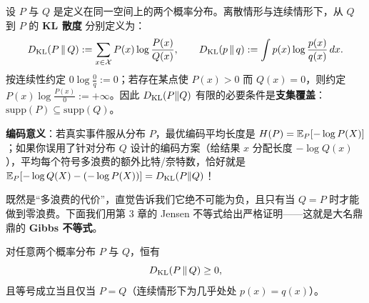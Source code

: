 \begin{defBox}
\begin{definition}
\label{def:ch4-kl}
设 $P$ 与 $Q$ 是定义在同一空间上的两个概率分布。离散情形与连续情形下，从 $Q$ 到 $P$ 的 \textbf{KL 散度} 分别定义为：
\begin{equation}
  D_{\mathrm{KL}}(P \,\|\, Q) := \sum_{x \in \mathcal{X}} P(x)\log\frac{P(x)}{Q(x)},
  \qquad
  D_{\mathrm{KL}}(p \,\|\, q) := \int p(x)\log\frac{p(x)}{q(x)}\,dx. \label{eq:ch4-kl}
\end{equation}
按连续性约定 $0\log\frac{0}{q} := 0$；若存在某点使 $P(x) > 0$ 而 $Q(x) = 0$，则约定 $P(x)\log\frac{P(x)}{0} := +\infty$。因此 $D_{\mathrm{KL}}(P\|Q)$ 有限的必要条件是\textbf{支集覆盖}：$\mathrm{supp}(P) \subseteq \mathrm{supp}(Q)$。
\end{definition}
\end{defBox}

\textbf{编码意义}：若真实事件服从分布 $P$，最优编码平均长度是 $H(P) = \mathbb{E}_P[-\log P(X)]$；如果你误用了针对分布 $Q$ 设计的编码方案（给结果 $x$ 分配长度 $-\log Q(x)$），平均每个符号多浪费的额外比特/奈特数，恰好就是 $\mathbb{E}_P[-\log Q(X) - (-\log P(X))] = D_{\mathrm{KL}}(P \| Q)$！

既然是“多浪费的代价”，直觉告诉我们它绝不可能为负，且只有当 $Q = P$ 时才能做到零浪费。下面我们用第 3 章的 Jensen 不等式给出严格证明——这就是大名鼎鼎的 \textbf{Gibbs 不等式}。

\begin{thmBox}
\begin{theorem}
\label{thm:ch4-gibbs}
对任意两个概率分布 $P$ 与 $Q$，恒有
\begin{equation}
  D_{\mathrm{KL}}(P \,\|\, Q) \ge 0, \label{eq:ch4-gibbs}
\end{equation}
且等号成立当且仅当 $P = Q$（连续情形下为几乎处处 $p(x) = q(x)$）。
\end{theorem}
\end{thmBox}


